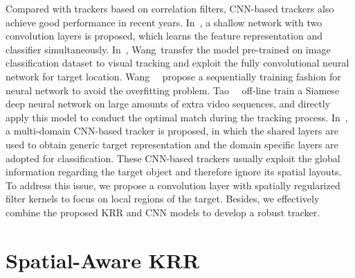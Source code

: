 \documentclass[10pt,twocolumn,letterpaper]{article}
\begin{document}
Compared with trackers based on correlation filters, CNN-based trackers also
achieve good performance in recent years. In~\cite{li2014robust}, a shallow network
with two convolution layers is proposed, which learns the feature representation
and classifier simultaneously. In~\cite{wang2015visual}, Wang~\etal transfer the
model pre-trained on image classification dataset to visual tracking and exploit
the fully convolutional neural network for target location.
Wang~\etal~\cite{wang2016stct} propose a sequentially training fashion for neural
network to avoid the overfitting problem. Tao~\etal~\cite{tao2016siamese} off-line
train a Siamese deep neural network on large amounts of extra video sequences, and
directly apply this model to conduct the optimal match during the tracking process.
In~\cite{nam2016learning}, a multi-domain CNN-based tracker is proposed,
in which the shared layers are used to obtain generic target representation
and the domain specific layers are adopted for classification.
These CNN-based trackers usually exploit the global information regarding the target
object and therefore ignore its spatial layouts. To address this issue, we propose
a convolution layer with spatially regularized filter kernels to focus on local
regions of the target. Besides, we effectively combine the proposed KRR and CNN models
to develop a robust tracker.

\section{Spatial-Aware KRR}
\end{document}
